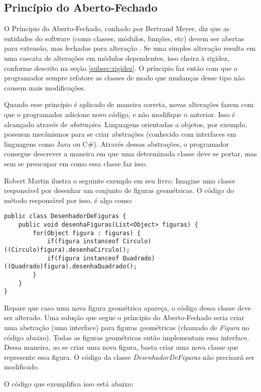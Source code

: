 \subsection{Princípio do Aberto-Fechado}
\label{subsec:ocp}

O Príncipio do Aberto-Fechado, cunhado por Bertrand Meyer, diz que as entidades do software (como classes, módulos, funções, etc)
devem ser abertas para extensão, mas fechadas para alteração \cite{meyer-ocp}. Se uma simples alteração resulta em uma cascata
de alterações em módulos dependentes, isso cheira à rigidez, conforme descrito na seção \ref{subsec:rigidez}. O príncipio faz então
com que o programador sempre refatore as classes de modo que mudanças desse tipo não causem mais modificações.

Quando esse princípio é aplicado de maneira correta, novas alterações fazem com que o programador adicione novo código, e não
modifique o anterior. Isso é alcançado através de \textit{abstrações}. Linguagens orientadas a objetos, por exemplo, possuem
mecânismos para se criar abstrações (conhecido com interfaces em linguagens como Java ou C\#). Através dessas abstrações,
o programador consegue descrever a maneira em que uma determinada classe deve se portar, mas sem se preocupar em como
essa classe faz isso.

Robert Martin \cite{bob-martin} ilustra o seguinte exemplo em seu livro: Imagine uma classe responsável por desenhar 
um conjunto de figuras geométricas. O código do método responsável por isso, é algo como:

\begin{lstlisting}[frame=trbl]
public class DesenhadorDeFiguras {
	public void desenhaFiguras(List<Object> figuras) {
		for(Object figura : figuras) {
			if(figura instanceof Circulo) ((Circulo)figura).desenhaCirculo();
			if(figura instanceof Quadrado) ((Quadrado)figura).desenhaQuadrado();
		}
	}
}
\end{lstlisting}

Repare que caso uma nova figura geométrica apareça, o código dessa classe deve ser alterado. Uma solução que segue
o príncipio do Aberto-Fechado seria criar uma abstração (uma interface) para figuras geométricas (chamado de \textit{Figura} no código abaixo).
Todas as figuras geométricas então implementam essa interface. Dessa maneira, ao se criar uma nova figura, basta criar uma nova classe
que represente essa figura. O código da classe \textit{DesenhadorDeFiguras} não precisará ser modificado.

O código que exemplifica isso está abaixo:

